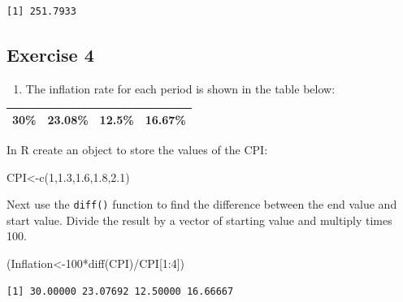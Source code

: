 \documentclass[
  letterpaper,
  DIV=11,
  numbers=noendperiod]{scrreprt}
\newenvironment{Shaded}{\begin{snugshade}}{\end{snugshade}}
\newcommand{\DecValTok}[1]{\textcolor[rgb]{0.68,0.00,0.00}{#1}}
\newcommand{\FloatTok}[1]{\textcolor[rgb]{0.68,0.00,0.00}{#1}}
\newcommand{\FunctionTok}[1]{\textcolor[rgb]{0.28,0.35,0.67}{#1}}
\newcommand{\NormalTok}[1]{\textcolor[rgb]{0.00,0.23,0.31}{#1}}
\newcommand{\OtherTok}[1]{\textcolor[rgb]{0.00,0.23,0.31}{#1}}
\newcommand{\SpecialCharTok}[1]{\textcolor[rgb]{0.37,0.37,0.37}{#1}}
\providecommand{\tightlist}{%
  \setlength{\itemsep}{0pt}\setlength{\parskip}{0pt}}\usepackage{longtable,booktabs,array}
\begin{document}
\begin{verbatim}
[1] 251.7933
\end{verbatim}

\hypertarget{exercise-4-1}{%
\subsection*{Exercise 4}\label{exercise-4-1}}

\begin{blackbox}

\begin{enumerate}
\def\labelenumi{\arabic{enumi}.}
\tightlist
\item
  The inflation rate for each period is shown in the table below:
\end{enumerate}

\begin{longtable}[]{@{}cccc@{}}
\toprule()
\endhead
30\% & 23.08\% & 12.5\% & 16.67\% \\
\bottomrule()
\end{longtable}

\end{blackbox}

In R create an object to store the values of the CPI:

\begin{Shaded}
\begin{Highlighting}[numbers=left,,]
\NormalTok{CPI}\OtherTok{\textless{}{-}}\FunctionTok{c}\NormalTok{(}\DecValTok{1}\NormalTok{,}\FloatTok{1.3}\NormalTok{,}\FloatTok{1.6}\NormalTok{,}\FloatTok{1.8}\NormalTok{,}\FloatTok{2.1}\NormalTok{)}
\end{Highlighting}
\end{Shaded}

Next use the \texttt{diff()} function to find the difference between the
end value and start value. Divide the result by a vector of starting
value and multiply times 100.

\begin{Shaded}
\begin{Highlighting}[numbers=left,,]
\NormalTok{(Inflation}\OtherTok{\textless{}{-}}\DecValTok{100}\SpecialCharTok{*}\FunctionTok{diff}\NormalTok{(CPI)}\SpecialCharTok{/}\NormalTok{CPI[}\DecValTok{1}\SpecialCharTok{:}\DecValTok{4}\NormalTok{])}
\end{Highlighting}
\end{Shaded}

\begin{verbatim}
[1] 30.00000 23.07692 12.50000 16.66667
\end{verbatim}
\end{document}
